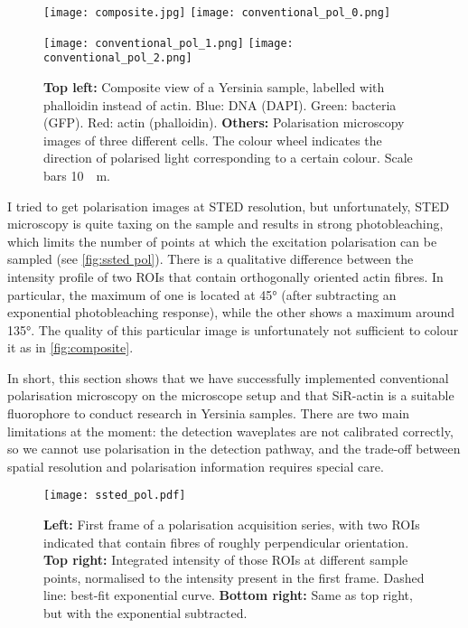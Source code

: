 \begin{figure}
	\centering
	\newlength{\spacing}
	\setlength{\spacing}{7pt}
	
	\texttt{[image: composite.jpg]}%
	\hspace{\spacing}%
	\texttt{[image: conventional\_pol\_0.png]}
	
	\vspace{\spacing}
	
	\texttt{[image: conventional\_pol\_1.png]}%
	\hspace{\spacing}%
	\texttt{[image: conventional\_pol\_2.png]}
	
	\caption{
		\textbf{Top left:} Composite view of a Yersinia sample, labelled with phalloidin instead of actin. Blue: DNA (DAPI). Green: bacteria (GFP). Red: actin (phalloidin).
		\textbf{Others:} Polarisation microscopy images of three different cells. The colour wheel indicates the direction of polarised light corresponding to a certain colour. Scale bars \SI{10}{\mu m}.
	}
	\label{fig:composite}
\end{figure}

I tried to get polarisation images at STED resolution, but unfortunately, STED microscopy is quite taxing on the sample and results in strong photobleaching, which limits the number of points at which the excitation polarisation can be sampled (see \autoref{fig:ssted pol}). There is a qualitative difference between the intensity profile of two ROIs that contain orthogonally oriented actin fibres. In particular, the maximum of one is located at \ang{45} (after subtracting an exponential photobleaching response), while the other shows a maximum around \ang{135}. The quality of this particular image is unfortunately not sufficient to colour it as in \autoref{fig:composite}.

In short, this section shows that we have successfully implemented conventional polarisation microscopy on the microscope setup and that SiR-actin is a suitable fluorophore to conduct research in Yersinia samples. There are two main limitations at the moment: the detection waveplates are not calibrated correctly, so we cannot use polarisation in the detection pathway, and the trade-off between spatial resolution and polarisation information requires special care.

\begin{figure}
	\centering
	\texttt{[image: ssted\_pol.pdf]}
	\caption{
		\textbf{Left:} First frame of a polarisation acquisition series, with two ROIs indicated that contain fibres of roughly perpendicular orientation. \textbf{Top right:} Integrated intensity of those ROIs at different sample points, normalised to the intensity present in the first frame. Dashed line: best-fit exponential curve. \textbf{Bottom right:} Same as top right, but with the exponential subtracted.
 	}
 	\label{fig:ssted pol}
\end{figure}

